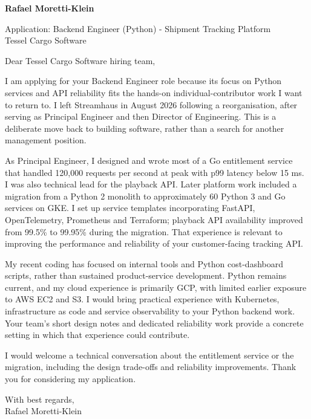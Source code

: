 \documentclass[11pt,a4paper]{article}
\begin{document}
{\Large\bfseries\color{primarycolor} Rafael Moretti-Klein}\par
Application: Backend Engineer (Python) - Shipment Tracking Platform\\
Tessel Cargo Software

Dear Tessel Cargo Software hiring team,

I am applying for your Backend Engineer role because its focus on Python services and API reliability fits the hands-on individual-contributor work I want to return to. I left Streamhaus in August 2026 following a reorganisation, after serving as Principal Engineer and then Director of Engineering. This is a deliberate move back to building software, rather than a search for another management position.

As Principal Engineer, I designed and wrote most of a Go entitlement service that handled 120,000 requests per second at peak with p99 latency below 15 ms. I was also technical lead for the playback API. Later platform work included a migration from a Python 2 monolith to approximately 60 Python 3 and Go services on GKE. I set up service templates incorporating FastAPI, OpenTelemetry, Prometheus and Terraform; playback API availability improved from 99.5\% to 99.95\% during the migration. That experience is relevant to improving the performance and reliability of your customer-facing tracking API.

My recent coding has focused on internal tools and Python cost-dashboard scripts, rather than sustained product-service development. Python remains current, and my cloud experience is primarily GCP, with limited earlier exposure to AWS EC2 and S3. I would bring practical experience with Kubernetes, infrastructure as code and service observability to your Python backend work. Your team's short design notes and dedicated reliability work provide a concrete setting in which that experience could contribute.

I would welcome a technical conversation about the entitlement service or the migration, including the design trade-offs and reliability improvements. Thank you for considering my application.

With best regards,\\
Rafael Moretti-Klein
\end{document}
